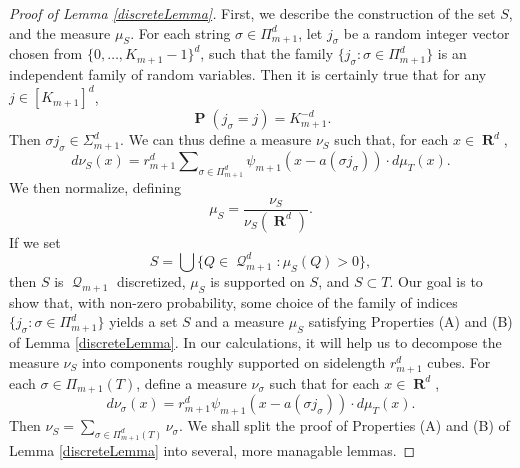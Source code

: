 \documentclass[12pt,reqno]{article}
\numberwithin{equation}{section}
\DeclareMathOperator{\RR}{\mathbf{R}}
\DeclareMathOperator{\PP}{\mathbf{P}}
\DeclareMathOperator{\DQ}{\mathcal{Q}}
\begin{document}
\begin{proof}[Proof of Lemma \ref{discreteLemma}]
    \renewcommand{\qedsymbol}{}
    First, we describe the construction of the set $S$, and the measure $\mu_S$. For each string $\sigma \in \Pi_{m+1}^d$, let $j_\sigma$ be a random integer vector chosen from $\{ 0, \dots, K_{m+1} - 1 \}^d$, such that the family $\{ j_\sigma : \sigma \in \Pi_{m+1}^d \}$ is an independent family of random variables. Then it is certainly true that for any $j \in [K_{m+1}]^d$,
    \begin{equation} \label{equation129412904912090}
        \PP(j_\sigma = j) = K_{m+1}^{-d}.
    \end{equation}
    Then $\sigma j_\sigma \in \Sigma_{m+1}^d$. We can thus define a measure $\nu_S$ such that, for each $x \in \RR^d$,
    \[ d\nu_S(x) = r_{m+1}^d \sum\nolimits_{\sigma \in \Pi_{m+1}^d} \psi_{m+1}(x - a(\sigma j_\sigma)) \cdot d\mu_T(x). \]
    We then normalize, defining
    \[ \mu_S = \frac{\nu_S}{\nu_S(\RR^d)}. \]
    If we set
    \[ S = \bigcup \{ Q \in \DQ_{m+1}^d : \mu_S(Q) > 0 \}, \]
    then $S$ is $\DQ_{m+1}$ discretized, $\mu_S$ is supported on $S$, and $S \subset T$. Our goal is to show that, with non-zero probability, some choice of the family of indices $\{ j_\sigma : \sigma \in \Pi_{m+1}^d \}$ yields a set $S$ and a measure $\mu_S$ satisfying Properties (A) and (B) of Lemma \ref{discreteLemma}. In our calculations, it will help us to decompose the measure $\nu_S$ into components roughly supported on sidelength $r_{m+1}^d$ cubes. For each $\sigma \in \Pi_{m+1}(T)$, define a measure $\nu_\sigma$ such that for each $x \in \RR^d$,
    \[ d\nu_\sigma(x) = r_{m+1}^d \psi_{m+1}(x - a(\sigma j_\sigma)) \cdot d\mu_T(x). \]
    Then $\nu_S = \sum_{\sigma \in \Pi_{m+1}^d(T)} \nu_\sigma$. We shall split the proof of Properties (A) and (B) of Lemma \ref{discreteLemma} into several, more managable lemmas.
\end{proof}
\end{document}
